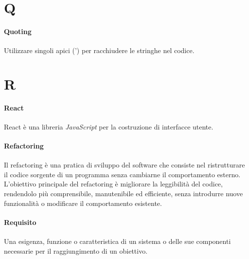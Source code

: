 \documentclass[10pt, a4paper]{article}
\begin{document}
\newpage
\section{Q}
\vspace{2em}
\paragraph{Quoting}\noindent\hrulefill
\paragraph{}Utilizzare singoli apici (') per racchiudere le stringhe nel codice.


\newpage
\section{R}
\vspace{2em}
\paragraph{React}\noindent\hrulefill
\paragraph{}React è una libreria \textit{JavaScript\pg} per la costruzione di interfacce utente.

\vspace{2em}
\paragraph{Refactoring}\noindent\hrulefill
\paragraph{}Il refactoring è una pratica di sviluppo del software che consiste nel ristrutturare il codice sorgente di un programma senza cambiarne il comportamento esterno. L'obiettivo principale del refactoring è migliorare la leggibilità del codice, rendendolo più comprensibile, manutenibile ed efficiente, senza introdurre nuove funzionalità o modificare il comportamento esistente.


\vspace{2em}
\paragraph{Requisito}\noindent\hrulefill
\paragraph{}Una esigenza, funzione o caratteristica di un sistema o delle sue componenti necessarie per il raggiungimento di un obiettivo. 
\end{document}
